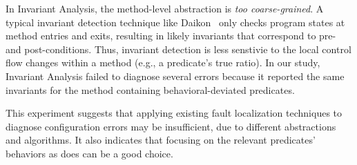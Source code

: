 In Invariant Analysis, the method-level abstraction is \textit{too coarse-grained}.
A typical invariant detection technique like Daikon~\cite{Ernst:1999}
only checks program states at method entries and exits, resulting in likely invariants that
correspond to pre- and post-conditions. Thus, invariant detection is less
senstivie to the local control flow changes within a method (e.g., a predicate's
true ratio). In our study, Invariant Analysis failed to diagnose several errors because it
reported the same invariants for the method containing behavioral-deviated predicates.





This experiment suggests that applying existing fault localization
techniques to diagnose configuration errors may be insufficient, due
to different abstractions and algorithms. It also indicates that
focusing on the relevant predicates' behaviors as \ourtool does
 can be a good choice.

